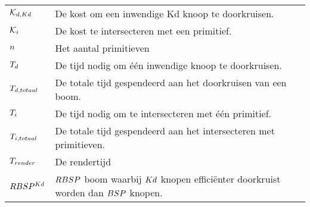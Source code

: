 \documentclass[master=cws,masteroption=mmc,oneside,english]{kulemt}
\begin{document}
\begin{flushleft}
\begin{tabularx}{\textwidth}{@{}p{25mm}X@{}}
    $\mathcal{K}_{d,Kd}$ & De kost om een inwendige Kd knoop te doorkruisen. \\
    $\mathcal{K}_{i}$ & De kost te intersecteren met een primitief. \\
    $n$ & Het aantal primitieven\\
    $T_{d}$ & De tijd nodig om één inwendige knoop te doorkruisen. \\
    $T_{d, totaal}$ & De totale tijd gespendeerd aan het doorkruisen van een boom. \\
    $T_{i}$ & De tijd nodig om te intersecteren met één primitief. \\
    $T_{i, totaal}$ & De totale tijd gespendeerd aan het intersecteren met primitieven. \\
    $T_{render}$ & De rendertijd\\
    $RBSP^{Kd}$ & $RBSP$ boom waarbij $Kd$ knopen efficiënter doorkruist worden dan $BSP$ knopen. \\
  
  \end{tabularx}
\end{flushleft}

\mainmatter







%
%

\backmatter


\end{document}

